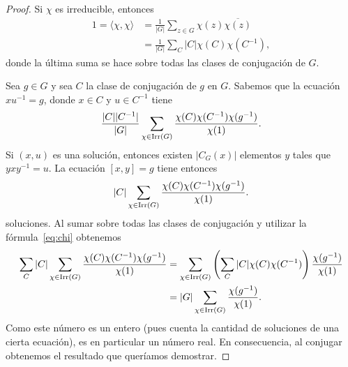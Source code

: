 \begin{proof}
    Si $\chi$ es irreducible, entonces
    \begin{equation}
    \label{eq:chi}
    \begin{aligned}
        1=\langle \chi,\chi\rangle &= \frac{1}{|G|}\sum_{z\in G}\chi(z)\overline{\chi(z)}\\
        &=\frac{1}{|G|}\sum_{C}|C|\chi(C)\chi(C^{-1}),
    \end{aligned}
    \end{equation}
    donde la última suma se hace sobre todas las clases de conjugación de $G$. 

    Sea $g\in G$ y sea $C$ la clase de conjugación de $g$ en $G$. Sabemos
    que la ecuación $xu^{-1}=g$, donde $x\in C$ y $u\in C^{-1}$ tiene 
    \[
    \frac{|C||C^{-1}|}{|G|}\sum_{\chi\in\operatorname{Irr}(G)}\frac{\chi(C)\chi(C^{-1})\chi(g^{-1})}{\chi(1)}.
    \]
    Si $(x,u)$ es una solución, entonces existen $|C_G(x)|$ elementos $y$ tales que 
    $yxy^{-1}=u$. La ecuación $[x,y]=g$ tiene entonces 
    \[
    |C|\sum_{\chi\in\operatorname{Irr}(G)}\frac{\chi(C)\chi(C^{-1})\chi(g^{-1})}{\chi(1)}.
    \]
    soluciones. Al sumar sobre todas las clases de conjugación y utilizar 
    la fórmula~\eqref{eq:chi} obtenemos
    \begin{align*}
    \sum_C|C|\sum_{\chi\in\operatorname{Irr}(G)}\frac{\chi(C)\chi(C^{-1})\chi(g^{-1})}{\chi(1)}
    &=\sum_{\chi\in\operatorname{Irr}(G)}\left(\sum_C|C|\chi(C)\chi(C^{-1})\right)\frac{\chi(g^{-1})}{\chi(1)}\\
    &=|G|\sum_{\chi\in\operatorname{Irr}(G)}\frac{\chi(g^{-1})}{\chi(1)}.
    \end{align*}
    Como este número es un entero (pues cuenta la cantidad de soluciones de una cierta ecuación), 
    es en particular un número real. En consecuencia, al conjugar obtenemos
    el resultado que queríamos demostrar.
\end{proof}

